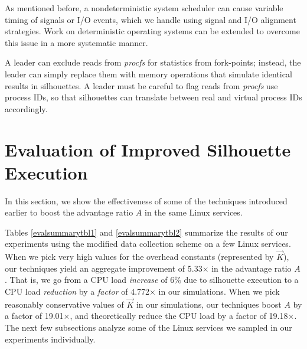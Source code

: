 As mentioned before, a nondeterministic system scheduler
can cause variable timing of signals or I/O events, which
we handle using signal and I/O alignment strategies. 
Work on deterministic operating systems can
be extended to overcome this issue
in a more systematic manner. \newline

 \newline
A leader can exclude reads from {\em procfs}
for statistics from fork-points; instead, the leader can simply replace
them with memory operations that simulate
identical results in silhouettes. A leader
must be careful to flag reads from {\em procfs}
use process IDs, so that silhouettes
can translate between real and virtual process IDs
accordingly.

\newpage
\section{Evaluation of Improved Silhouette Execution} \label{sileval}
In this section, we show the effectiveness of some of the techniques
introduced earlier to boost the advantage ratio $A$ in the 
same Linux services.

Tables \ref{evalsummarytbl1} and \ref{evalsummarytbl2} summarize the results of our experiments
using the modified data collection scheme on a few Linux services.
When we pick very high values for the overhead constants (represented by $\vec K$),
our techniques yield an aggregate improvement of 5.33$\times$
in the advantage ratio $A$. That is, 
we go from a CPU load {\em increase} of 6\% due
to silhouette execution to a CPU load {\em reduction} by a 
{\em factor} of 4.772$\times$ in our simulations. When we pick reasonably conservative
values of $\vec K$ in our simulations, our techniques boost $A$ by a factor of 19.01$\times$,
and theoretically reduce the CPU load by a factor of 19.18$\times$.
The next few subsections analyze some of 
the Linux services we sampled in our experiments
individually.

